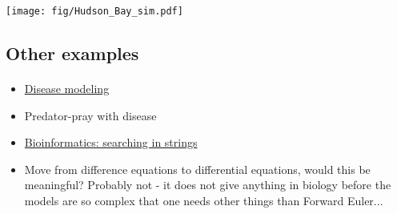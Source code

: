 \documentclass[%
twoside,                 %
final,                   %
10pt]{article}
\begin{document}
\centerline{\texttt{[image: fig/Hudson\_Bay\_sim.pdf]}}




\subsection*{Other examples}

\paragraph{}
\begin{itemize}
 \item \href{{http://hplgit.github.io/disease-modeling/doc/web/index.html}}{Disease modeling}

 \item Predator-pray with disease

 \item \href{{http://hplgit.github.io/bioinf-py/doc/web/index.html}}{Bioinformatics: searching in strings}

 \item Move from difference equations to differential equations, would this be meaningful? Probably not - it does not give anything in biology before the models are so complex that one needs other things than Forward Euler...
\end{itemize}

\noindent





\printindex
\end{document}
